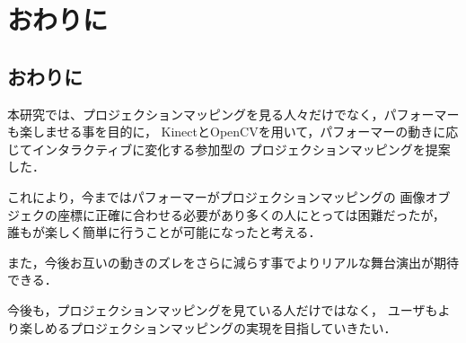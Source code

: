 \chapter{おわりに}
\thispagestyle{fancy}

\section{おわりに}

本研究では、プロジェクションマッピングを見る人々だけでなく，パフォーマーも楽しませる事を目的に，
KinectとOpenCVを用いて，パフォーマーの動きに応じてインタラクティブに変化する参加型の
プロジェクションマッピングを提案した．

これにより，今まではパフォーマーがプロジェクションマッピングの
画像オブジェクの座標に正確に合わせる必要があり多くの人にとっては困難だったが，
誰もが楽しく簡単に行うことが可能になったと考える．

また，今後お互いの動きのズレをさらに減らす事でよりリアルな舞台演出が期待できる．

今後も，プロジェクションマッピングを見ている人だけではなく，
ユーザもより楽しめるプロジェクションマッピングの実現を目指していきたい．
